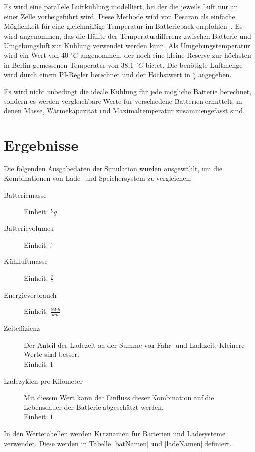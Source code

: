 Es wird eine parallele Luftkühlung modelliert, bei der die jeweils Luft nur an einer Zelle vorbeigeführt wird. Diese Methode wird von Pesaran als einfache Möglichkeit für eine gleichmäßige Temperatur im Batteriepack empfohlen~\cite{pesaran2001battery}. Es wird angenommen, das die Hälfte der Temperaturdifferenz zwischen Batterie und Umgebungsluft zur Kühlung verwendet werden kann. Als Umgebungstemperatur wird ein Wert von 40 $^{\circ}C$ angenommen, der noch eine kleine Reserve zur höchsten in Berlin gemessenen Temperatur von 38,1 $^{\circ}C$ bietet\cite{tempRekord}. Die benötigte Luftmenge wird durch einem PI-Regler berechnet und der Höchstwert in $\frac{g}{s}$ angegeben.

Es wird nicht unbedingt die ideale Kühlung für jede mögliche Batterie berechnet, sondern es werden vergleichbare Werte für verschiedene Batterien ermittelt, in denen Masse, Wärmekapazität und Maximaltemperatur zusammengefasst sind.

\section{Ergebnisse}
\label{simErgebnisse}
Die folgenden Ausgabedaten der Simulation wurden ausgewählt, um die Kombinationen von Lade- und Speichersystem zu vergleichen:
\begin{description}
	\item[Batteriemasse] Einheit: $kg$
	\item[Batterievolumen] Einheit: $l$
	\item[Kühlluftmasse] Einheit: $\frac{g}{s}$
	\item[Energieverbrauch] Einheit: $\frac{kWh}{km}$
	\item[Zeiteffizienz] Der Anteil der Ladezeit an der Summe von Fahr- und Ladezeit. Kleinere Werte sind besser.\\
	Einheit: $1$
	\item[Ladezyklen pro Kilometer] Mit diesem Wert kann der Einfluss dieser Kombination auf die Lebensdauer der Batterie abgeschätzt werden.\\
	Einheit: $1$
\end{description}

In den Wertetabellen werden Kurznamen für Batterien und Ladesysteme verwendet. Diese werden in Tabelle \ref{batNamen} und \ref{ladeNamen} definiert.

